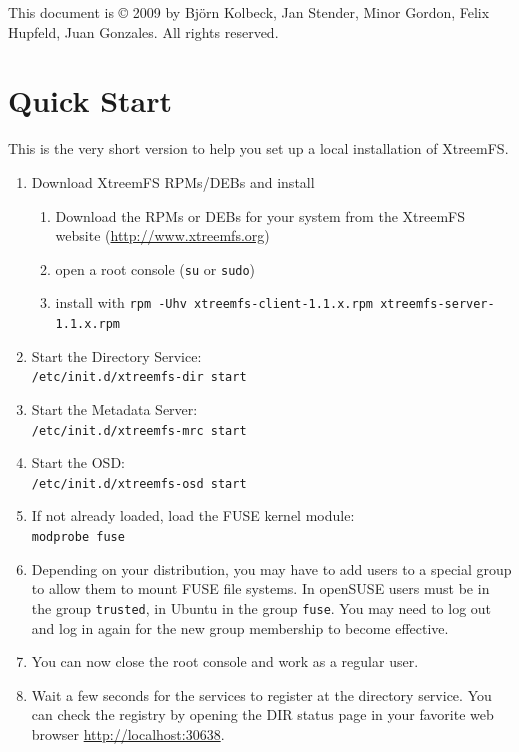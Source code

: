 \documentclass[a4paper,10pt]{book}
\begin{document}
This document is \copyright{} 2009 by Bj\"orn Kolbeck, Jan Stender, Minor Gordon, Felix Hupfeld, Juan Gonzales. All rights reserved.

\setcounter{tocdepth}{10}
\tableofcontents

\chapter{Quick Start}

This is the very short version to help you set up a local installation of XtreemFS.

\begin{enumerate}
 \item Download XtreemFS RPMs/DEBs and install
	\begin{enumerate}
		\item Download the RPMs or DEBs for your system from the XtreemFS website (\href{http://www.xtreemfs.org}{http://www.xtreemfs.org})
		\item open a root console (\texttt{su} or \texttt{sudo})
		\item install with \texttt{rpm -Uhv xtreemfs-client-1.1.x.rpm xtreemfs-server-1.1.x.rpm}
	\end{enumerate}
\item Start the Directory Service:\\
	\texttt{/etc/init.d/xtreemfs-dir start}
\item Start the Metadata Server:\\
	\texttt{/etc/init.d/xtreemfs-mrc start}
\item Start the OSD:\\
	\texttt{/etc/init.d/xtreemfs-osd start}

\item If not already loaded, load the FUSE kernel module:\\
	\texttt{modprobe fuse}

\item Depending on your distribution, you may have to add users to a special group to allow them to mount FUSE file systems. In openSUSE users must be in the group \texttt{trusted}, in Ubuntu in the group \texttt{fuse}. You may need to log out and log in again for the new group membership to become effective.

\item You can now close the root console and work as a regular user.

\item Wait a few seconds for the services to register at the directory service. You can check the registry by opening the DIR status page in your favorite web browser \href{http://localhost:30638}{http://localhost:30638}.


\end{enumerate}
\end{document}

